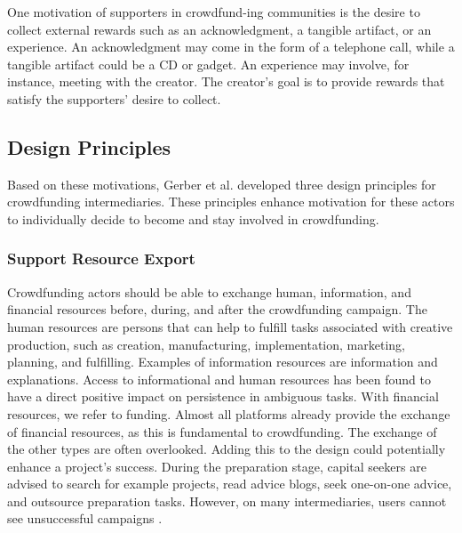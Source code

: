 One motivation of supporters in crowdfund-ing communities is the desire to collect external rewards such as an acknowledgment, a tangible artifact, or an experience. An acknowledgment may come in the form of a telephone call, while a tangible artifact could be a CD or gadget. An experience may involve, for instance, meeting with the creator. The creator’s goal is to provide rewards that satisfy the supporters’ desire to collect.

\subsection{Design Principles}
Based on these motivations, Gerber et al. \cite{crowdMotiv} developed three design principles for crowdfunding
intermediaries. These principles enhance motivation for these actors to individually decide to become and
stay involved in crowdfunding.

\subsubsection*{Support Resource Export}
Crowdfunding actors should be able to exchange human, information, and financial resources before, during, and after the crowdfunding campaign. The human resources are persons that can help to fulfill tasks
associated with creative production, such as creation, manufacturing, implementation, marketing, planning,
and fulfilling. Examples of information resources are information and explanations.
Access to informational and human resources has been found to have a direct positive impact on persistence
in ambiguous tasks. With financial resources, we refer to funding. Almost all platforms already provide the
exchange of financial resources, as this is fundamental to crowdfunding. The exchange of the other types are
often overlooked. Adding this to the design could potentially enhance a project’s success.
During the preparation stage, capital seekers are advised to search for example projects, read advice blogs,
seek one-on-one advice, and outsource preparation tasks. However, on many intermediaries, users cannot
see unsuccessful campaigns \cite{10.1145/2531602.2531715}.

